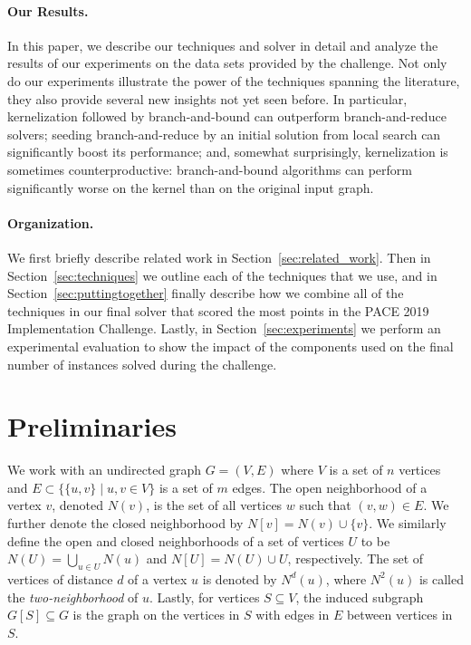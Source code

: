 \documentclass[twoside,leqno,twocolumn]{article}
\newcommand{\csch}[1]{{\color{red} CS: #1}}
\begin{document}
\paragraph*{Our Results.}
In this paper, we describe our techniques and solver in detail and analyze the results of our experiments on the data sets provided by the challenge.
Not only do our experiments illustrate the power of the techniques spanning the literature, they also provide several new insights not yet seen before.
In particular, kernelization followed by branch-and-bound can outperform branch-and-reduce solvers; seeding branch-and-reduce by an initial solution from local search can significantly boost its performance; and, somewhat surprisingly, kernelization is sometimes counterproductive: branch-and-bound algorithms can perform significantly worse on the kernel than on the original input graph.

\paragraph*{Organization.}
We first briefly describe related work in Section~\ref{sec:related_work}. Then in Section~\ref{sec:techniques} we outline each of the techniques that we use, and in Section~\ref{sec:puttingtogether} finally describe how we combine all of the techniques in our final solver that scored the most points in the PACE 2019 Implementation Challenge. Lastly, in Section~\ref{sec:experiments} we perform an experimental evaluation to show the impact of the components used on the final number of instances solved during the challenge.

\section{Preliminaries}
\label{sec:preliminaries}
We work with an undirected graph $G = (V,E)$ where $V$ is a set of $n$ vertices and $E\subset \{\{u,v\}\mid u,v\in V\}$ is a set of $m$ edges. The open neighborhood of a vertex $v$, denoted $N(v)$, is the set of all vertices $w$ such that $(v,w)\in E$. We further denote the closed neighborhood by $N[v]=N(v)\cup\{v\}$. We similarly define the open and closed neighborhoods of a set of vertices $U$ to be $N(U) = \bigcup_{u\in U}N(u)$ and $N[U] = N(U) \cup U$, respectively. The set of vertices of distance $d$ of a vertex $u$ is denoted by $N^d(u)$, where $N^2(u)$ is called the \emph{two-neighborhood} of $u$. Lastly, for vertices $S\subseteq V$, the induced subgraph $G[S]\subseteq G$ is the graph on the vertices in $S$ with edges in $E$ between vertices in $S$.
\end{document}
